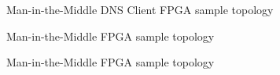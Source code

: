 \documentclass[a4paper]{report}
\begin{document}
\begin{figure}[h!]
  \caption{Man-in-the-Middle DNS Client FPGA sample topology}
\end{figure}

\begin{figure}[h!]
  \caption{Man-in-the-Middle FPGA sample topology}
\end{figure}

\begin{figure}[h!]
  \caption{Man-in-the-Middle FPGA sample topology}
\end{figure}
\end{document}
